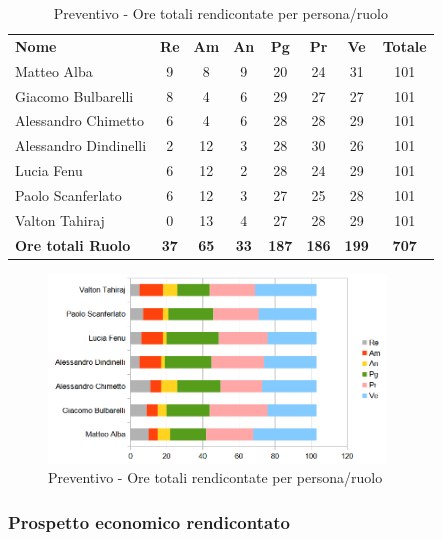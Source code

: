 		\begin{table} [h!]
			\begin{center}
				\begin{tabular} { m{3.5cm} c c c c c c c }
					\rowcolor{lightgray}
					\textbf{Nome} & \textbf{Re} & \textbf{Am} & \textbf{An} & \textbf{Pg} & \textbf{Pr} & \textbf{Ve} & \textbf{Totale} \\
					Matteo Alba & 9 & 8 & 9 & 20 & 24 & 31 & 101 \\
					Giacomo Bulbarelli & 8 & 4 & 6 & 29 & 27 & 27 & 101 \\
					Alessandro Chimetto & 6 & 4 & 6 & 28 & 28 & 29 & 101 \\
					Alessandro Dindinelli & 2 & 12 & 3 & 28 & 30 & 26 & 101 \\
					Lucia Fenu & 6 & 12 & 2 & 28 & 24 & 29 & 101 \\
					Paolo Scanferlato & 6 & 12 & 3 & 27 & 25 & 28 & 101 \\
					Valton Tahiraj & 0 & 13 & 4 & 27 & 28 & 29 & 101 \\
					\textbf{Ore totali Ruolo} & \textbf{37} & \textbf{65} & \textbf{33} & \textbf{187} & \textbf{186}& \textbf{199} & \textbf{707}
				\end{tabular}
				\caption{Preventivo - Ore totali rendicontate per persona/ruolo}
			\end{center}
		\end{table}
	
		\begin{figure} [h!]
			\centering
			\includegraphics[width=0.8\textwidth]{res/img/preventivi/totrend-barre.png}
			\caption{Preventivo - Ore totali rendicontate per persona/ruolo} 
		\end{figure}
	
	\newpage
	
	\subsubsection{Prospetto economico rendicontato}
	
